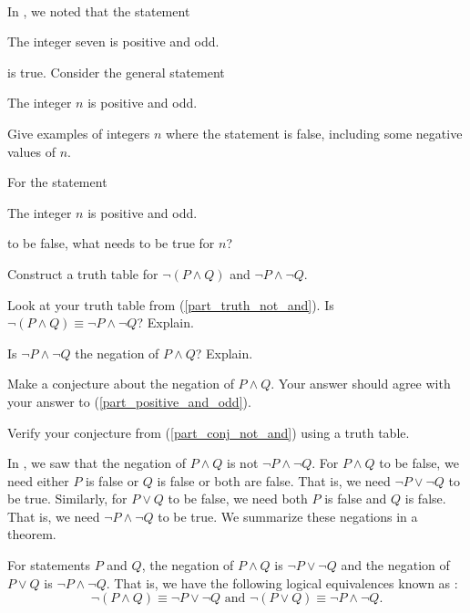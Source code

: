 \begin{act}
\label{act_not_and}
~
    \begin{actpart}
        \item In , we noted that the statement  
            \begin{center}
                The integer seven is positive and odd.
            \end{center} 
        is true.  Consider the general statement 
            \begin{center}
                The integer $n$ is positive and odd.
            \end{center}  
            Give examples of integers $n$ where the statement is false, including some negative values of $n$.
        \item \label{part_positive_and_odd} For the statement 
            \begin{center}
                The integer $n$ is positive and odd.   
            \end{center} 
        to be false, what needs to be true for $n$?
        \item \label{part_truth_not_and} Construct a truth table for $\neg(P \land Q)$ and $\neg P \land \neg Q$.  
        \item Look at your truth table from (\ref{part_truth_not_and}).  Is $\neg(P \land Q) \equiv \neg P \land \neg Q$?  Explain.
        \item Is $\neg P \land \neg Q$ the negation of $P \land Q$? Explain.
        \item \label{part_conj_not_and} Make a conjecture about the negation of $P \land Q$. Your answer should agree with your answer to (\ref{part_positive_and_odd}).
        \item Verify your conjecture from (\ref{part_conj_not_and}) using a truth table.
    \end{actpart}
\end{act}

In , we saw that the negation of $P \land Q$ is not $\neg P \land \neg Q$.  For $P \land Q$ to be false, we need either $P$ is false or $Q$ is false or both are false. That is, we need $\neg P \lor \neg Q$ to be true. Similarly, for $P \lor Q$ to be false, we need both $P$ is false and $Q$ is false.  That is, we need $\neg P \land \neg Q$ to be true.  We summarize these negations in a theorem.

\begin{thm}
\label{thm_demorgans}
For statements $P$ and $Q$, the negation of $P \land Q$ is $\neg P \lor \neg Q$ and the negation of $P \lor Q$ is $\neg P \land \neg Q$.  That is, we have the following logical equivalences known as :
$$\neg(P \land Q) \equiv \neg P \lor \neg Q\text{ and }\neg(P \lor Q) \equiv \neg P \land \neg Q.$$  
\end{thm}

